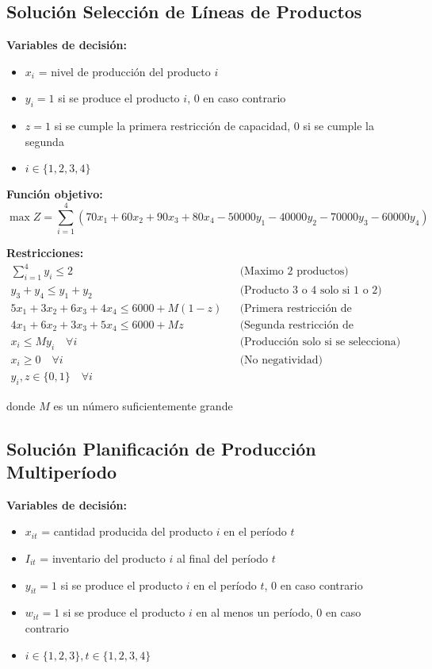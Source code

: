 \documentclass[12pt]{article}
\begin{document}
\subsection{Solución Selección de Líneas de Productos}

\textbf{Variables de decisión:}
\begin{itemize}
    \item $x_i$ = nivel de producción del producto $i$
    \item $y_i = 1$ si se produce el producto $i$, 0 en caso contrario
    \item $z = 1$ si se cumple la primera restricción de capacidad, 0 si se cumple la segunda
    \item $i \in \{1, 2, 3, 4\}$
\end{itemize}

\textbf{Función objetivo:}
$$\max Z = \sum_{i=1}^{4} (70x_1 + 60x_2 + 90x_3 + 80x_4 - 50000y_1 - 40000y_2 - 70000y_3 - 60000y_4)$$

\textbf{Restricciones:}
\begin{align*}
    \sum_{i=1}^{4} y_i \leq 2 && \text{(Maximo 2 productos)} \\
    y_3 + y_4 \leq y_1 + y_2 && \text{(Producto 3 o 4 solo si 1 o 2)} \\
    5x_1 + 3x_2 + 6x_3 + 4x_4 \leq 6000 + M(1-z) && \text{(Primera restricción de capacidad)} \\
    4x_1 + 6x_2 + 3x_3 + 5x_4 \leq 6000 + Mz && \text{(Segunda restricción de capacidad)} \\
    x_i \leq My_i \quad \forall i && \text{(Producción solo si se selecciona)} \\
    x_i \geq 0 \quad \forall i && \text{(No negatividad)} \\
    y_i, z \in \{0,1\} \quad \forall i
\end{align*}
\begin{center}
donde $M$ es un número suficientemente grande
\end{center}

\subsection{Solución Planificación de Producción Multiperíodo}

\textbf{Variables de decisión:}
\begin{itemize}
    \item $x_{it}$ = cantidad producida del producto $i$ en el período $t$
    \item $I_{it}$ = inventario del producto $i$ al final del período $t$
    \item $y_{it} = 1$ si se produce el producto $i$ en el período $t$, 0 en caso contrario
    \item $w_{it} = 1$ si se produce el producto $i$ en al menos un período, 0 en caso contrario
    \item $i \in \{1, 2, 3\}, t \in \{1, 2, 3, 4\}$
\end{itemize}
\end{document}
